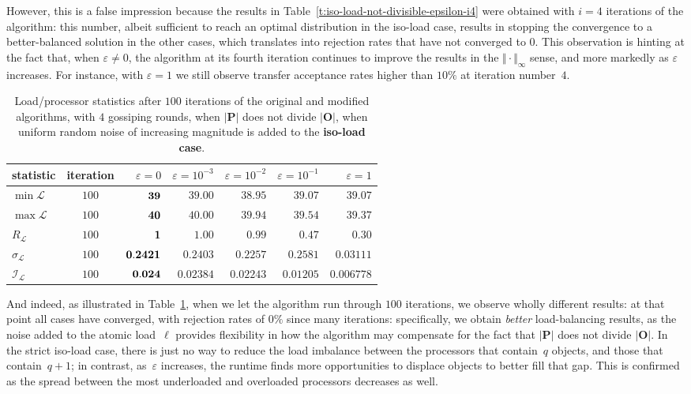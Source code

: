 However, this is a false impression because the results in
Table~\ref{t:iso-load-not-divisible-epsilon-i4} were obtained with
$i=4$ iterations of the algorithm: this
number, albeit sufficient to reach an optimal distribution in the
iso-load case, results in stopping the convergence to a
better-balanced solution in the other cases, which translates into
rejection rates that have not converged to $0$.
This observation is hinting at the fact that, when $\varepsilon\neq0$,
the algorithm at its fourth iteration continues to improve the results
in the $\Vert\cdot\Vert_{\infty}$ sense, and more markedly as
$\varepsilon$ increases.
For instance, with $\varepsilon=1$ we still observe transfer
acceptance rates higher than $10\%$ at iteration number~$4$.

\begin{table}[htb!]
\begin{center}
\begin{tabular}{@{}lcrrrrr@{}}
\hline
statistic & iteration
& $\varepsilon=0$
& $\varepsilon=10^{-3}$
& $\varepsilon=10^{-2}$
& $\varepsilon=10^{-1}$
& $\varepsilon=1$ \\
\hline\hline
$\min{\mathcal{L}}$
&$100$ &$\bf39$ &$39.00$ &$38.95$ &$39.07$ &$39.07$ \\\hline
$\max{\mathcal{L}}$
&$100$ &$\bf40$ &$40.00$ &$39.94$ &$39.54$ &$39.37$ \\\hline
$R_{\mathcal{L}}$
&$100$ &$\bf1$ &$1.00$ &$0.99$ &$0.47$ &$0.30$ \\\hline
$\sigma_{\mathcal{L}}$
&$100$ &$\bf0.2421$ &$0.2403$ &$0.2257$ &$0.2581$ &$0.03111$ \\\hline
$\mathcal{I}_\mathcal{L}$
&$100$ &$\bf0.024$ &$0.02384$ &$0.02243$ &$0.01205$ &$0.006778$ \\\hline
\end{tabular}
\end{center}
\caption{\label{t:iso-load-not-divisible-epsilon-i100}
Load/processor statistics after $100$ iterations of the
original and modified algorithms, with $4$ gossiping rounds, when
$\vert\mathbf{P}\vert$ does not divide $\vert\mathbf{O}\vert$, when
uniform random noise of increasing magnitude is added to the
\textbf{iso-load case}.}
\end{table}
And indeed, as illustrated in
Table~\ref{t:iso-load-not-divisible-epsilon-i100}, when we let the
algorithm run through $100$ iterations, we observe wholly different
results: at that point all cases have converged, with rejection rates
of $0\%$ since many iterations: specifically, we obtain \emph{better}
load-balancing results, as the noise added to the atomic load~$\ell$
provides flexibility in how the algorithm may compensate for the fact
that $\vert\mathbf{P}\vert$ does not divide $\vert\mathbf{O}\vert$.
In the strict iso-load case, there is just no way to reduce the
load imbalance between the processors that contain~$q$ objects, and
those that contain~$q+1$; in contrast, as~$\varepsilon$ increases, the
runtime finds more opportunities to displace objects to better fill
that gap. This is confirmed as the spread between the most underloaded
and overloaded processors decreases as well.

